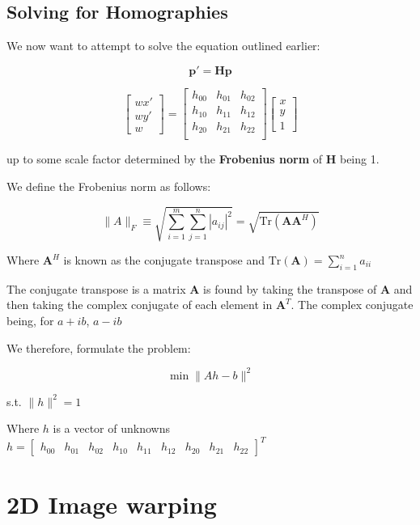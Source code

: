 \documentclass{article}
\begin{document}
\subsection{Solving for Homographies}

We now want to attempt to solve the equation outlined earlier:

\[
  \mathbf{p' = Hp}
\]

\[
  \begin{bmatrix}
    wx' \\ wy' \\ w
  \end{bmatrix} =
  \begin{bmatrix}
    h_{00} & h_{01} & h_{02} \\
    h_{10} & h_{11} & h_{12} \\
    h_{20} & h_{21} & h_{22} \\
  \end{bmatrix}\begin{bmatrix}
    x \\ y \\ 1
  \end{bmatrix}
\]


up to some scale factor determined by the \textbf{Frobenius norm} of $\mathbf{H}$ being 1.

  We define the Frobenius norm as follows:

  \[
    \| A \|_{F} \equiv \sqrt{\sum_{i=1}^m \sum_{j=1}^n |a_{ij}|^{2} } = \sqrt{\text{Tr}(\mathbf{A}\mathbf{A}^{H}  )}
  \]

  Where $\mathbf{A}^{H} $ is known as the conjugate transpose and $\text{Tr}(\mathbf{A} ) = \sum_{i=1}^n a_{ii}$

  The conjugate transpose is a matrix $\mathbf{A} $ is found by taking the transpose of $\mathbf{A} $ and then taking the complex conjugate of each element in $\mathbf{A}^{T} $. The complex conjugate being, for $a + ib$, $a - ib$


  We therefore, formulate the problem:

  \[
    \min\|Ah-b\|^{2}
  \]

  s.t. $\|h\|^{2}=1$

  Where $h$ is a vector of unknowns $h =  \begin{bmatrix}
    h_{00} & h_{01} & h_{02} &
    h_{10} & h_{11} & h_{12} &
    h_{20} & h_{21} & h_{22}
  \end{bmatrix}^{T}$

  \section{2D Image warping}
\end{document}
